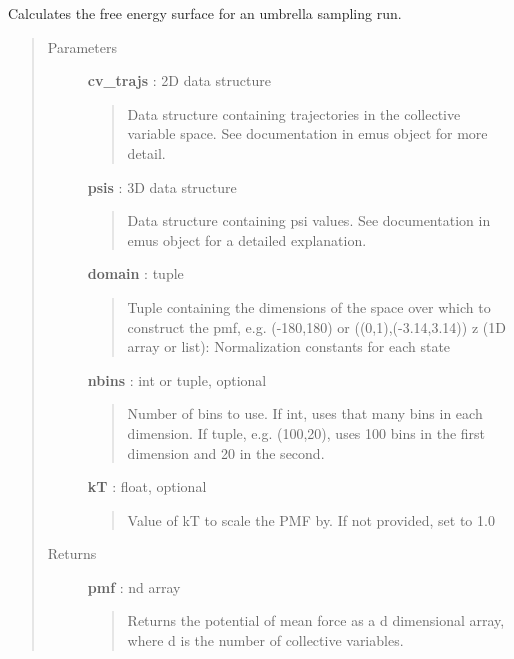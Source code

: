 \documentclass[letterpaper,10pt,english]{sphinxmanual}
\begin{document}

\begin{fulllineitems}
\label{modules/emusroutines:emusroutines.make_pmf}
Calculates the free energy surface for an umbrella sampling run.
\begin{quote}\begin{description}
\item[{Parameters}] \leavevmode
\textbf{cv\_trajs} : 2D data structure
\begin{quote}

Data structure containing trajectories in the collective variable space.  See documentation in emus object for more detail.
\end{quote}

\textbf{psis} : 3D data structure
\begin{quote}

Data structure containing psi values.  See documentation in emus object for a detailed explanation.
\end{quote}

\textbf{domain} : tuple
\begin{quote}

Tuple containing the dimensions of the space over which to construct the pmf, e.g. (-180,180) or ((0,1),(-3.14,3.14)) z (1D array or list): Normalization constants for each state
\end{quote}

\textbf{nbins} : int or tuple, optional
\begin{quote}

Number of bins to use.  If int, uses that many bins in each dimension.  If tuple, e.g. (100,20), uses 100 bins in the first dimension and 20 in the second.
\end{quote}

\textbf{kT} : float, optional
\begin{quote}

Value of kT to scale the PMF by.  If not provided, set to 1.0
\end{quote}

\item[{Returns}] \leavevmode
\textbf{pmf} : nd array
\begin{quote}

Returns the potential of mean force as a d dimensional array, where d is the number of collective variables.
\end{quote}

\end{description}\end{quote}

\end{fulllineitems}
\end{document}

